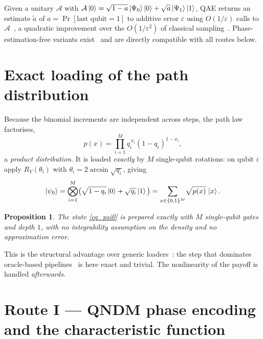 \documentclass[11pt]{article}
\newtheorem{theorem}{Proposition}
\begin{document}
Given a unitary $\mathcal{A}$ with $\mathcal{A}\ket{0}=\sqrt{1-a}\ket{\Psi_0}\ket{0}+\sqrt{a}\ket{\Psi_1}\ket{1}$, QAE returns an estimate $\tilde a$ of $a=\Pr[\text{last qubit}=1]$ to additive error $\varepsilon$ using $O(1/\varepsilon)$ calls to $\mathcal{A}$~\cite{brassard2002amplitude}, a quadratic improvement over the $O(1/\varepsilon^2)$ of classical sampling~\cite{montanaro2015quantum}. Phase-estimation-free variants exist~\cite{suzuki2020amplitude,herbert2022qmci} and are directly compatible with all routes below.

\section{Exact loading of the path distribution}\label{sec_loading}

Because the binomial increments are independent across steps, the path law factorises,
\begin{equation}\label{eq_product}
p(x)=\prod_{i=1}^{M} q_i^{\,x_i}(1-q_i)^{1-x_i},
\end{equation}
a \emph{product distribution}. It is loaded \emph{exactly} by $M$ single-qubit rotations: on qubit $i$ apply $R_Y(\theta_i)$ with $\theta_i=2\arcsin\sqrt{q_i}$, giving
\begin{equation}\label{eq_psi0}
\ket{\psi_0}=\bigotimes_{i=1}^{M}\!\big(\sqrt{1-q_i}\ket{0}+\sqrt{q_i}\ket{1}\big)=\sum_{x\in\{0,1\}^M}\!\sqrt{p(x)}\,\ket{x}.
\end{equation}
\begin{theorem}\label{prop_load}
The state \eqref{eq_psi0} is prepared exactly with $M$ single-qubit gates and depth $1$, with no integrability assumption on the density and no approximation error.
\end{theorem}
This is the structural advantage over generic loaders~\cite{grover2002creating,Stamatopoulos_2020}: the step that dominates oracle-based pipelines~\cite{chakrabarti2021threshold} is here exact and trivial. The nonlinearity of the payoff is handled \emph{afterwards}.

\section{Route I --- QNDM phase encoding and the characteristic function}\label{sec_qndm}
\end{document}
